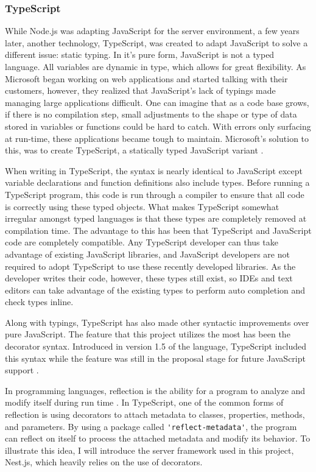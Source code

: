 \subsubsection{TypeScript} \label{sec:typescript}
While Node.js was adapting JavaScript for the server environment, a few years later, another technology, TypeScript, was created to adapt JavaScript to solve a different issue: static typing.  In it's pure form, JavaScript is not a typed language.  All variables are dynamic in type, which allows for great flexibility.  As Microsoft began working on web applications and started talking with their customers, however, they realized that JavaScript's lack of typings made managing large applications difficult.  One can imagine that as a code base grows, if there is no compilation step, small adjustments to the shape or type of data stored in variables or functions could be hard to catch.  With errors only surfacing at run-time, these applications became tough to maintain.  Microsoft's solution to this, was to create TypeScript, a statically typed JavaScript variant \cite{idgnewsservicestaffMicrosoftAugmentsJavaScript2012}.

When writing in TypeScript, the syntax is nearly identical to JavaScript except variable declarations and function definitions also include types.  Before running a TypeScript program, this code is run through a compiler to ensure that all code is correctly using these typed objects. What makes TypeScript somewhat irregular amongst typed languages is that these types are completely removed at compilation time. The advantage to this has been that TypeScript and JavaScript code are completely compatible.  Any TypeScript developer can thus take advantage of existing JavaScript libraries, and JavaScript developers are not required to adopt TypeScript to use these recently developed libraries.  As the developer writes their code, however, these types still exist, so IDEs and text editors can take advantage of the existing types to perform auto completion and check types inline.

Along with typings, TypeScript has also made other syntactic improvements over pure JavaScript.  The feature that this project utilizes the most has been the decorator syntax.  Introduced in version 1.5 of the language, TypeScript included this syntax while the feature was still in the proposal stage for future JavaScript support \cite{turnerAnnouncingTypeScript2015}.

In programming languages, reflection is the ability for a program to analyze and modify itself during run time \cite{malenfantTutorialBehavioralReflection1996}.  In TypeScript, one of the common forms of reflection is using decorators to attach metadata to classes, properties, methods, and parameters.  By using a package called \Verb!'reflect-metadata'!, the program can reflect on itself to process the attached metadata and modify its behavior.  To illustrate this idea, I will introduce the server framework used in this project, Nest.js, which heavily relies on the use of decorators.

